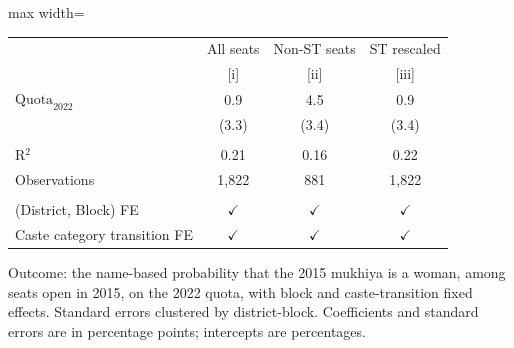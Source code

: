
\begingroup
\centering
\scriptsize
\begin{adjustbox}{max width=\linewidth}
   \begin{threeparttable}[b]
      \begin{tabular}{lccc}
         \toprule
                                      & All seats     & Non-ST seats  & ST rescaled \\
                                      & [i]           & [ii]          & [iii]\\
         \midrule
         $\text{Quota}_{2022}$        & 0.9           & 4.5           & 0.9\\
                                      & (3.3)         & (3.4)         & (3.4)\\
          \\
         R$^2$                        & 0.21          & 0.16          & 0.22\\
         Observations                 & 1,822         & 881           & 1,822\\
          \\
         (District, Block) FE         & $\checkmark$  & $\checkmark$  & $\checkmark$\\
         Caste category transition FE & $\checkmark$  & $\checkmark$  & $\checkmark$\\
         \bottomrule
      \end{tabular}

      \begin{tablenotes}
         \item Outcome: the name-based probability that the 2015 mukhiya is a woman, among seats open in 2015, on the 2022 quota, with block and caste-transition fixed effects. Standard errors clustered by district-block. Coefficients and standard errors are in percentage points; intercepts are percentages.
      \end{tablenotes}
   \end{threeparttable}
\end{adjustbox}
\par\endgroup


